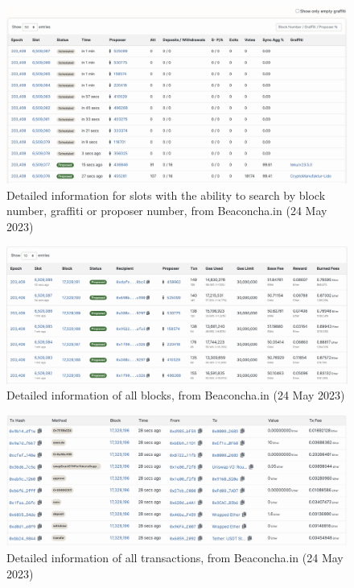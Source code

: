 \documentclass[UTF8]{article}
\begin{document}
{\begin{figure}[htbp]
\begin{center}
\includegraphics[width=0.9\linewidth]{images/bslots}
\caption{Detailed information for slots with the ability to search by block number, graffiti or proposer number, from Beaconcha.in (24 May 2023)}
\label{fig:bslots}
\end{center}
\end{figure}

\begin{figure}[htbp]
\begin{center}
\includegraphics[width=0.9\linewidth]{images/bblocks}
\caption{Detailed information of all blocks, from Beaconcha.in (24 May 2023)}
\label{fig:bblocks}
\end{center}
\end{figure}

\begin{figure}[htbp]
\begin{center}
\includegraphics[width=0.9\linewidth]{images/btxns}
\caption{Detailed information of all transactions, from Beaconcha.in (24 May 2023)}
\label{fig:btxns}
\end{center}
\end{figure}

}
\end{document}
